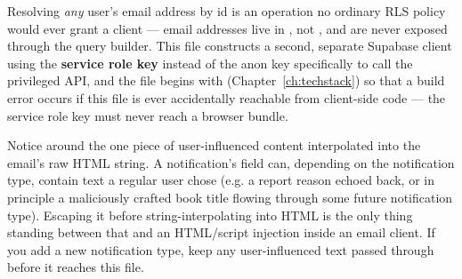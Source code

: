 Resolving \emph{any} user's email address by id is an operation no ordinary RLS policy would ever grant a client — email addresses live in , not , and are never exposed through the query builder. This file constructs a second, separate Supabase client using the \textbf{service role key} instead of the anon key specifically to call the privileged  API, and the file begins with  (Chapter~\ref{ch:techstack}) so that a build error occurs if this file is ever accidentally reachable from client-side code — the service role key must never reach a browser bundle.

\begin{olkwarn}
Notice  around the one piece of user-influenced content interpolated into the email's raw HTML string. A notification's  field can, depending on the notification type, contain text a regular user chose (e.g. a report reason echoed back, or in principle a maliciously crafted book title flowing through some future notification type). Escaping it before string-interpolating into HTML is the only thing standing between that and an HTML/script injection inside an email client. If you add a new notification type, keep any user-influenced text passed through  before it reaches this file.
\end{olkwarn}

